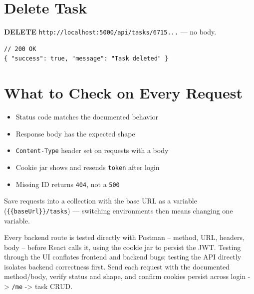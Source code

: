 \section{Delete Task}

\textbf{DELETE} \texttt{http://localhost:5000/api/tasks/6715...} --- no body.

\begin{lstlisting}
// 200 OK
{ "success": true, "message": "Task deleted" }
\end{lstlisting}

\section{What to Check on Every Request}

\begin{itemize}
\item[$\square$] Status code matches the documented behavior
\item[$\square$] Response body has the expected shape
\item[$\square$] \texttt{Content-Type} header set on requests with a body
\item[$\square$] Cookie jar shows and resends \texttt{token} after login
\item[$\square$] Missing ID returns \texttt{404}, not a \texttt{500}
\end{itemize}

\begin{tipbox}[TIP]
Save requests into a collection with the base URL as a variable
(\texttt{\{\{baseUrl\}\}/tasks}) --- switching environments then means
changing one variable.
\end{tipbox}

\whatwhyhow
{Every backend route is tested directly with Postman -- method, URL, headers, body -- before React calls it, using the cookie jar to persist the JWT.}
{Testing through the UI conflates frontend and backend bugs; testing the API directly isolates backend correctness first.}
{Send each request with the documented method/body, verify status and shape, and confirm cookies persist across login -> \texttt{/me} -> task CRUD.}
